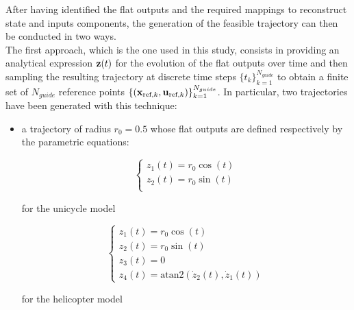 \documentclass[../main.tex]{subfiles}
\begin{document}
After having identified the flat outputs and the required mappings to
reconstruct state and inputs components, the
generation of the feasible trajectory can then be conducted in two ways.\\

\pagebreak
The first approach, which is the one used in this study, consists in providing
an analytical expression $\mathbf{z}(t)$ for the evolution of the flat outputs over time and
then sampling  the resulting trajectory at discrete time steps
$\{t_k\}_{k=1}^{N_{guide}}$	to obtain a finite set of $N_{guide}$ reference
points $\{(\mathbf{x}_{\text{ref}, k}, \mathbf{u}_{\text{ref}, k})\}_{k=1}^{N_{guide}}$.
In particular, two trajectories have been generated with this technique:
\begin{itemize}
	
	\item a  trajectory of radius $r_0 = 0.5$ whose flat
		outputs are defined respectively by the parametric equations:
		\vspace{-0.5cm}
		\begin{multicols}{2}
			\begin{equation*}
				\begin{cases}
					z_1(t) = r_0 \cos(t)\\
					z_2(t) = r_0 \sin(t)\\
				\end{cases}
			\end{equation*}
			\begin{center}
				for the unicycle model\\
			\end{center}
		\columnbreak
			\begin{equation*}
				\begin{cases}
					z_1(t) = r_0 \cos(t)\\
					z_2(t) = r_0 \sin(t)\\
					z_3(t) = 0\\
					z_4(t) = \text{atan2}\left(\dot{z}_2(t), \dot{z}_1(t)\right)
				\end{cases}
			\end{equation*}
			\begin{center}
				for the helicopter model
			\end{center}
		\end{multicols}


\end{itemize}
\end{document}
